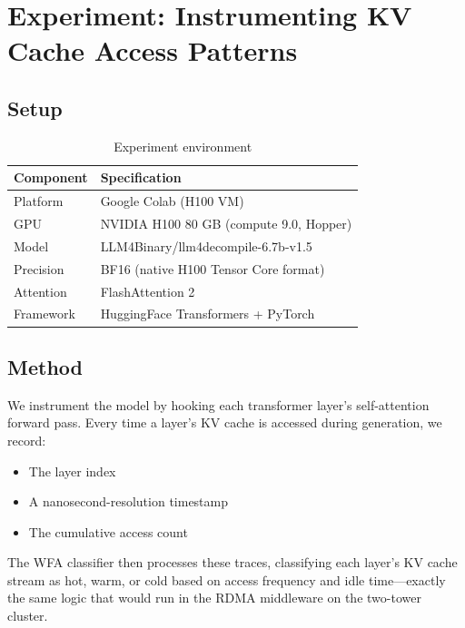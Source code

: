 \documentclass[11pt,letterpaper]{article}
\begin{document}
\section{Experiment: Instrumenting KV Cache Access Patterns}
\label{sec:experiment}

\subsection{Setup}

\begin{table}[htbp]
\centering
\caption{Experiment environment}
\label{tab:experiment-setup}
\begin{tabular}{@{}ll@{}}
\toprule
\textbf{Component} & \textbf{Specification} \\
\midrule
Platform & Google Colab (H100 VM) \\
GPU & NVIDIA H100 80 GB (compute 9.0, Hopper) \\
Model & LLM4Binary/llm4decompile-6.7b-v1.5 \\
Precision & BF16 (native H100 Tensor Core format) \\
Attention & FlashAttention 2 \\
Framework & HuggingFace Transformers + PyTorch \\
\bottomrule
\end{tabular}
\end{table}

\subsection{Method}

We instrument the model by hooking each transformer layer's self-attention forward pass. Every time a layer's KV cache is accessed during generation, we record:

\begin{itemize}
    \item The layer index
    \item A nanosecond-resolution timestamp
    \item The cumulative access count
\end{itemize}

The WFA classifier then processes these traces, classifying each layer's KV cache stream as hot, warm, or cold based on access frequency and idle time---exactly the same logic that would run in the RDMA middleware on the two-tower cluster.
\end{document}
